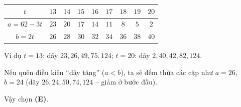 {
\begin{center}\small
\begin{tabular}{|c|c|c|c|c|c|c|c|c|}
\hline
\rowcolor{tmBlue!10}$t$ & $13$ & $14$ & $15$ & $16$ & $17$ & $18$ & $19$ & $20$\\ \hline
$a=62-3t$ & $23$ & $20$ & $17$ & $14$ & $11$ & $8$ & $5$ & $2$\\ \hline
$b=2t$ & $26$ & $28$ & $30$ & $32$ & $34$ & $36$ & $38$ & $40$\\ \hline
\end{tabular}
\end{center}
Ví dụ $t=13$: dãy $23, 26, 49, 75, 124$; $t=20$: dãy $2, 40, 42, 82, 124$.
\begin{warnbox}Nếu quên điều kiện ``dãy tăng'' ($a<b$), ta sẽ đếm thừa các cặp như $a=26$, $b=24$ (dãy $26, 24, 50, 74, 124$ -- giảm ở bước đầu).\end{warnbox}
Vậy chọn \textbf{(E)}.
}

